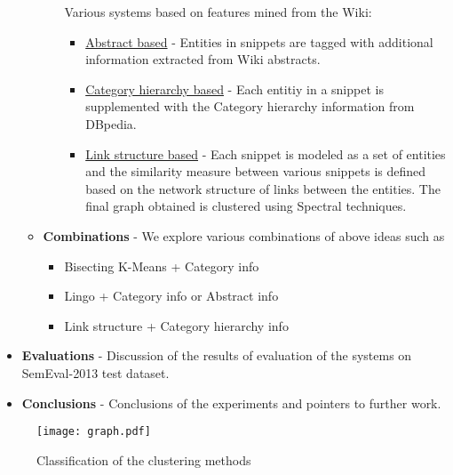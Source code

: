 \documentclass[a4paper,12pt]{article}
\begin{document}
\begin{itemize}
\begin{itemize}
\begin{itemize}
        Various systems based on features mined from the Wiki:
        \begin{itemize}
          \item \underline{Abstract based} - Entities in snippets are tagged with
            additional information extracted from Wiki abstracts.
          \item \underline{Category hierarchy based} - Each entitiy in a snippet
            is supplemented with the Category hierarchy information from
            DBpedia. 
          \item \underline{Link structure based} - Each snippet is modeled as a
            set of entities and the similarity measure between various
            snippets is defined based on the network structure of
            links between the entities. The final graph obtained is
            clustered using Spectral techniques. \cite{Ferragina}
        \end{itemize}
     \end{itemize}
    \item {\bf Combinations} - We explore various combinations of
      above ideas such as
      \begin{itemize}
        \item Bisecting K-Means + Category info
        \item Lingo + Category info or Abstract info
        \item Link structure + Category hierarchy info
      \end{itemize}
  \end{itemize}
  \item {\bf Evaluations} - Discussion of the results of evaluation
     of the systems on SemEval-2013 test dataset. 
  \item {\bf Conclusions} - Conclusions of the experiments and
     pointers to further work.
\end{itemize}


\begin{figure}[h]
  \centering
  \texttt{[image: graph.pdf]}
  \caption{Classification of the clustering methods}
  \label{fig:classify}
\end{figure}

\end{document}
